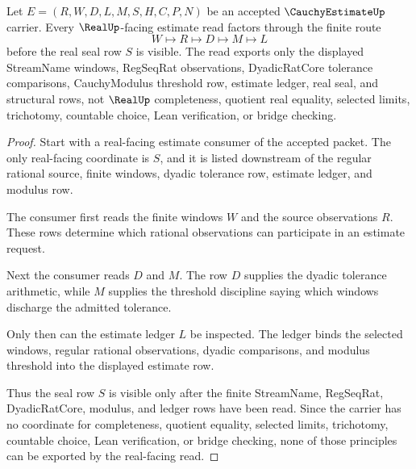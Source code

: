\begin{theorem}\label{thm:cauchy-estimate-real-seal-handoff}
Let $E=(R,W,D,L,M,S,H,C,P,N)$ be an accepted $\CauchyEstimateUp$ carrier. Every $\RealUp$-facing estimate read factors through the finite route
$$
W \longmapsto R \longmapsto D \longmapsto M \longmapsto L
$$
before the real seal row $S$ is visible. The read exports only the displayed StreamName windows, RegSeqRat observations, DyadicRatCore tolerance comparisons, CauchyModulus threshold row, estimate ledger, real seal, and structural rows, not $\RealUp$ completeness, quotient real equality, selected limits, trichotomy, countable choice, Lean verification, or bridge checking.
\end{theorem}
\begin{proof}
Start with a real-facing estimate consumer of the accepted packet. The only real-facing coordinate is $S$, and it is listed downstream of the regular rational source, finite windows, dyadic tolerance row, estimate ledger, and modulus row.

The consumer first reads the finite windows $W$ and the source observations $R$. These rows determine which rational observations can participate in an estimate request.

Next the consumer reads $D$ and $M$. The row $D$ supplies the dyadic tolerance arithmetic, while $M$ supplies the threshold discipline saying which windows discharge the admitted tolerance.

Only then can the estimate ledger $L$ be inspected. The ledger binds the selected windows, regular rational observations, dyadic comparisons, and modulus threshold into the displayed estimate row.

Thus the seal row $S$ is visible only after the finite StreamName, RegSeqRat, DyadicRatCore, modulus, and ledger rows have been read. Since the carrier has no coordinate for completeness, quotient equality, selected limits, trichotomy, countable choice, Lean verification, or bridge checking, none of those principles can be exported by the real-facing read.
\end{proof}


